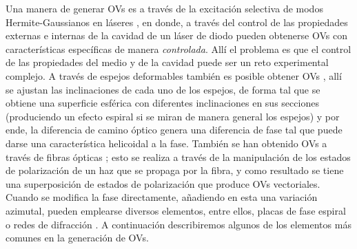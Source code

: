 Una manera de generar OVs es a través de la excitación selectiva de modos Hermite-Gaussianos en láseres \cite{Ohtomo2008}, en donde, a través del control de las propiedades externas e internas de la cavidad de un láser de diodo pueden obtenerse OVs con características específicas de manera \textit{controlada}. Allí el problema es que el control de las propiedades del medio y de la cavidad puede ser un reto experimental complejo. A través de espejos deformables también es posible obtener OVs \cite{Tyson2008}, allí se ajustan las inclinaciones de cada uno de los espejos, de forma tal que se obtiene una superficie esférica con diferentes inclinaciones en sus secciones (produciendo un efecto espiral si se miran de manera general los espejos) y por ende, la diferencia de camino óptico genera una diferencia de fase tal que puede darse una característica helicoidal a la fase. También se han obtenido OVs a través de fibras ópticas \cite{KrishnaInavalli2010, Gao2014}; esto se realiza a través de la manipulación de los estados de polarización de un haz que se propaga por la fibra, y como resultado se tiene una superposición de estados de polarización que produce OVs vectoriales.\\




Cuando se modifica la fase directamente, añadiendo en esta una variación azimutal, pueden emplearse diversos elementos, entre ellos, placas de fase espiral \cite{Ruffato2014, Schemmel2014,  Sueda2004} o redes de difracción \cite{Heckenberg1992, Bekshaev2010a, Bekshaev2010}. A continuación describiremos algunos de los elementos más comunes en la generación de OVs.\\

